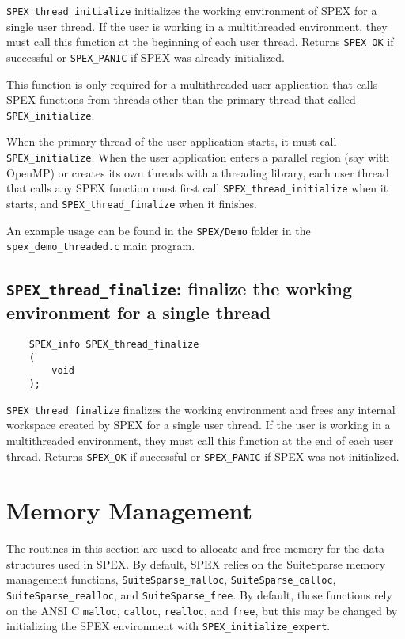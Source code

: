 \documentclass[12pt,oneside]{book}
\theoremstyle{definition}
\begin{document}
\verb|SPEX_thread_initialize| initializes the working environment of SPEX for a single
user thread. If the user is working in a multithreaded environment, they must call 
this function at the beginning of each user thread. Returns \verb|SPEX_OK| if successful 
or \verb|SPEX_PANIC| if SPEX was already initialized.

This function is only required for a multithreaded user application that
calls SPEX functions from threads other than the primary thread that
called \verb'SPEX_initialize'.

When the primary thread of the user application starts, it must call
\verb'SPEX_initialize'.  When the user application enters a parallel
region (say with OpenMP) or creates its own threads with a threading library,
each user thread that calls any SPEX function must first call \verb'SPEX_thread_initialize'
when it starts, and \verb'SPEX_thread_finalize' when it finishes.

An example usage can be found in the \verb'SPEX/Demo' folder in the
\verb'spex_demo_threaded.c' main program.

\subsection{\texttt{SPEX\_thread\_finalize}: finalize the working environment for a single thread}

\begin{mdframed}[userdefinedwidth=\textwidth]
{\footnotesize
\begin{verbatim}
    SPEX_info SPEX_thread_finalize
    ( 
        void 
    );
\end{verbatim}
} \end{mdframed}

\verb|SPEX_thread_finalize| finalizes the working environment and frees any 
internal workspace created by SPEX for a single user thread. If the user is working
in a multithreaded environment, they must call this function at the end of each
user thread. Returns \verb|SPEX_OK| if successful or \verb|SPEX_PANIC| if SPEX was not 
initialized.


\section{Memory Management} \label{s:user:memmanag}
The routines in this section are used to allocate and free memory for the data
structures used in SPEX.  By default, SPEX relies on the SuiteSparse
memory management functions, \verb|SuiteSparse_malloc|,
\verb|SuiteSparse_calloc|, \verb|SuiteSparse_realloc|, and
\verb|SuiteSparse_free|.  By default, those functions rely on the ANSI C
\verb|malloc|, \verb|calloc|, \verb|realloc|, and \verb|free|, but this may be
changed by initializing the SPEX environment with
\verb|SPEX_initialize_expert|.
\end{document}
